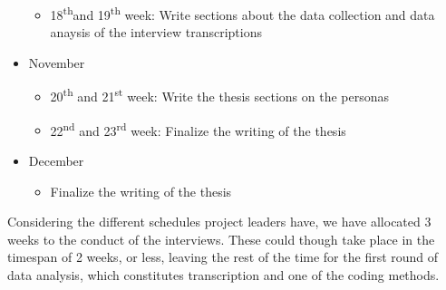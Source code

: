 \documentclass[a4paper]{article}
\begin{document}
\begin{itemize}
\begin{itemize}
	\item 18\textsuperscript{th}and 19\textsuperscript{th} week: Write sections about the data collection and data anaysis of the interview transcriptions
	\end{itemize}	
\item November
	\begin{itemize}
	\item 20\textsuperscript{th} and 21\textsuperscript{st} week: Write the thesis sections on the personas 
	\item 22\textsuperscript{nd} and 23\textsuperscript{rd} week: Finalize the writing of the thesis
	\end{itemize}		
\item December
	\begin{itemize}
	\item Finalize the writing of the thesis
	\end{itemize}			
\end{itemize}

\noindent Considering the different schedules project leaders have, we have allocated 3 weeks to the conduct of the interviews. These could though take place in the timespan of 2 weeks, or less, leaving the rest of the time for the first round of data analysis, which constitutes transcription and one of the coding methods.



\end{document}
